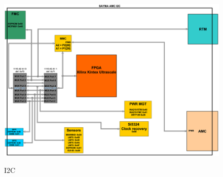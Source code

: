 	\begin{figure}[htbp!]
		\centering
		\includegraphics[scale=0.2]{img/i2c.eps}\\
		\caption{I2C} \label{I2C}
	\end{figure}

